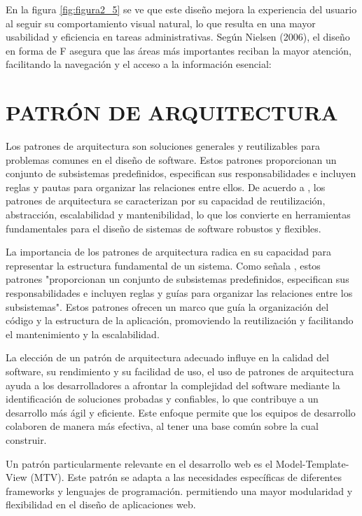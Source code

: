 		En la figura \ref{fig:figura2_5} se ve que este diseño mejora la experiencia del usuario al seguir su comportamiento visual natural, lo que resulta en una mayor usabilidad y eficiencia en tareas administrativas. Según Nielsen (2006), el diseño en forma de F asegura que las áreas más importantes reciban la mayor atención, facilitando la navegación y el acceso a la información esencial:
	
	\section{PATRÓN DE ARQUITECTURA}
		Los patrones de arquitectura son soluciones generales y reutilizables para problemas comunes en el diseño de software. Estos patrones proporcionan un conjunto de subsistemas predefinidos, especifican sus responsabilidades e incluyen reglas y pautas para organizar las relaciones entre ellos. De acuerdo a \textcite{cervantes2016arquitectura}, los patrones de arquitectura se caracterizan por su capacidad de reutilización, abstracción, escalabilidad y mantenibilidad, lo que los convierte en herramientas fundamentales para el diseño de sistemas de software robustos y flexibles.
		
		La importancia de los patrones de arquitectura radica en su capacidad para representar la estructura fundamental de un sistema. Como señala \textcite{pressman2010ingenieria}, estos patrones "proporcionan un conjunto de subsistemas predefinidos, especifican sus responsabilidades e incluyen reglas y guías para organizar las relaciones entre los subsistemas". Estos patrones ofrecen un marco que guía la organización del código y la estructura de la aplicación, promoviendo la reutilización y facilitando el mantenimiento y la escalabilidad.
		
		La elección de un patrón de arquitectura adecuado influye en la calidad del software, su rendimiento y su facilidad de uso, el uso de patrones de arquitectura ayuda a los desarrolladores a afrontar la complejidad del software mediante la identificación de soluciones probadas y confiables, lo que contribuye a un desarrollo más ágil y eficiente. Este enfoque permite que los equipos de desarrollo colaboren de manera más efectiva, al tener una base común sobre la cual construir.
		
		Un patrón particularmente relevante en el desarrollo web es el Model-Template-View (MTV). Este patrón se adapta a las necesidades específicas de diferentes frameworks y lenguajes de programación. permitiendo una mayor modularidad y flexibilidad en el diseño de aplicaciones web. 
		
